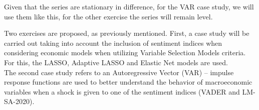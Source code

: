 Given that the series are stationary in difference, for the VAR case study, we will use them like this, for the other exercise the series will remain level.


Two exercises are proposed, as previously mentioned. First, a case study will be carried out taking into account the inclusion of sentiment indices when considering economic models when utilizing Variable Selection Models criteria. For this, the LASSO, Adaptive LASSO and Elastic Net models are used.\\

The second case study refers to an Autoregressive Vector (VAR) -- impulse response functions are used to better understand the behavior of macroeconomic variables when a shock is given to one of the sentiment indices (VADER and LM- SA-2020).\\





